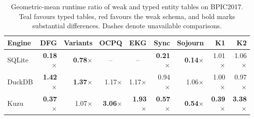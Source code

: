 \begin{table}[t]
\caption{Geometric-mean runtime ratio of weak and typed entity tables on BPIC2017. Teal favours typed tables, red favours the weak schema, and bold marks substantial differences. Dashes denote unavailable comparisons.}\label{tab:typing-results}
\centering
\footnotesize
\setlength{\tabcolsep}{3pt}
\renewcommand{\arraystretch}{1.15}
\begin{tabular*}{\linewidth}{@{\extracolsep{\fill}}lrrrrrrrr@{}}
\toprule
Engine & DFG & Variants & OCPQ & EKG & Sync & Sojourn & K1 & K2 \\
\midrule
SQLite & \cellcolor{red!44}\textbf{0.18$\times$} & \cellcolor{red!7}\textbf{0.78$\times$} & \multicolumn{1}{c}{--} & \multicolumn{1}{c}{--} & \cellcolor{red!41}\textbf{0.21$\times$} & \cellcolor{red!51}\textbf{0.14$\times$} & 1.01$\times$ & \cellcolor{teal!2}1.06$\times$ \\
DuckDB & \cellcolor{teal!9}\textbf{1.42$\times$} & \cellcolor{teal!8}\textbf{1.37$\times$} & \cellcolor{teal!4}1.17$\times$ & \cellcolor{teal!4}1.17$\times$ & \cellcolor{red!1}0.94$\times$ & \cellcolor{teal!2}1.06$\times$ & 1.00$\times$ & \cellcolor{red!1}0.97$\times$ \\
Kuzu & \cellcolor{red!26}\textbf{0.37$\times$} & \cellcolor{teal!2}1.07$\times$ & \cellcolor{teal!29}\textbf{3.06$\times$} & \cellcolor{teal!17}\textbf{1.93$\times$} & \cellcolor{red!15}\textbf{0.57$\times$} & \cellcolor{red!16}\textbf{0.54$\times$} & \cellcolor{red!25}\textbf{0.39$\times$} & \cellcolor{teal!32}\textbf{3.38$\times$} \\
\bottomrule
\end{tabular*}
\end{table}
